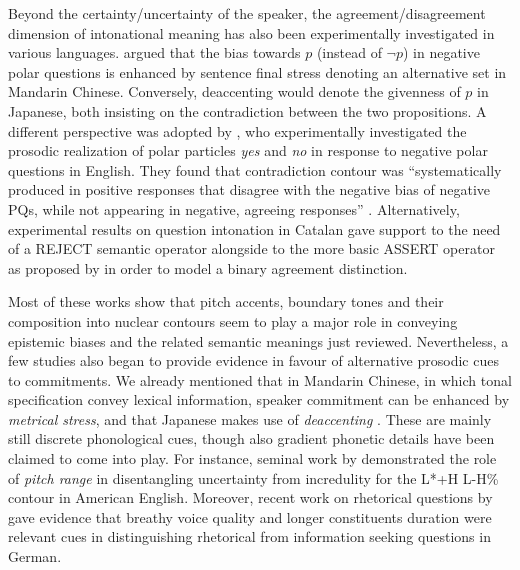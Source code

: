 \documentclass[output=paper,colorlinks,citecolor=brown]{langscibook}
\begin{document}
Beyond the certainty/uncertainty of the speaker, the agreement/disagreement dimension of intonational meaning has also been experimentally investigated in various languages. \citet{hara2014} argued that the bias towards $p$ (instead of $\neg p$) in negative polar questions is enhanced by sentence final stress denoting an alternative set in Mandarin Chinese. Conversely, deaccenting would denote the givenness of $p$ in Japanese, both insisting on the contradiction between the two propositions. A different perspective was adopted by \citet{GoodhueWagner2018}, who experimentally investigated the prosodic realization of polar particles \textit{yes} and \textit{no} in response to negative polar questions in English. They found that  contradiction contour was ``systematically produced in positive responses that disagree with the negative bias of negative PQs, while not appearing in negative, agreeing responses'' \citep[39]{GoodhueWagner2018}. Alternatively,  experimental results on question intonation in Catalan gave support to the need of a REJECT semantic operator alongside to the more basic ASSERT operator as proposed by \citet{krifka2015bias, Krifka2017} in order to model a binary agreement distinction.

Most of these works show that pitch accents, boundary tones and their composition into nuclear contours seem to play a major role in conveying epistemic biases and the related semantic meanings just reviewed. Nevertheless, a few studies also began to provide evidence in favour of alternative prosodic cues to commitments. We already mentioned that in Mandarin Chinese, in which tonal specification convey lexical information, speaker commitment can be enhanced by \textit{metrical stress}, and that Japanese makes use of \textit{deaccenting} \citep{hara2014}. These are mainly still discrete phonological cues, though also gradient phonetic details have been claimed to come into play. For instance, seminal work by \citet{hirschberg92} demonstrated the role of \textit{pitch range} in disentangling uncertainty from incredulity for the L*+H L-H\% contour in American English. Moreover, recent work on rhetorical questions by \citet{Braun+2018} gave evidence that breathy voice quality and longer constituents duration were relevant cues in distinguishing rhetorical from information seeking questions in German.
\end{document}
